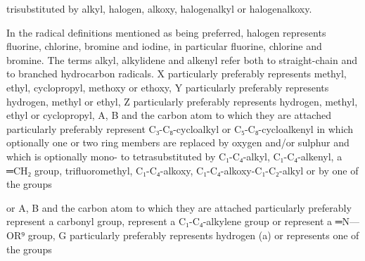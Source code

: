 \documentclass[11pt,a4paper]{article}
\begin{document}
trisubstituted by alkyl, halogen, alkoxy, halogenalkyl or halogenalkoxy.

In the radical definitions mentioned as being preferred, halogen represents fluorine, chlorine, bromine and iodine, in particular fluorine, chlorine and bromine. The terms alkyl, alkylidene and alkenyl refer both to straight-chain and to branched hydrocarbon radicals. X particularly preferably represents methyl, ethyl, cyclopropyl, methoxy or ethoxy, Y particularly preferably represents hydrogen, methyl or ethyl, Z particularly preferably represents hydrogen, methyl, ethyl or cyclopropyl, A, B and the carbon atom to which they are attached particularly preferably represent C₃-C₈-cycloalkyl or C₅-C₈-cycloalkenyl in which optionally one or two ring members are replaced by oxygen and/or sulphur and which is optionally mono- to tetrasubstituted by C₁-C₄-alkyl, C₁-C₄-alkenyl, a ═CH₂ group, trifluoromethyl, C₁-C₄-alkoxy, C₁-C₄-alkoxy-C₁-C₂-alkyl or by one of the groups

or A, B and the carbon atom to which they are attached particularly preferably represent a carbonyl group, represent a C₁-C₄-alkylene group or represent a ═N—OR⁹ group, G particularly preferably represents hydrogen (a) or represents one of the groups
\end{document}
